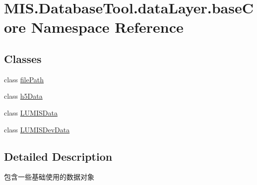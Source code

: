 \hypertarget{namespaceMIS_1_1DatabaseTool_1_1dataLayer_1_1baseCore}{}\section{M\+I\+S.\+Database\+Tool.\+data\+Layer.\+base\+Core Namespace Reference}
\label{namespaceMIS_1_1DatabaseTool_1_1dataLayer_1_1baseCore}
\subsection*{Classes}
\begin{DoxyCompactItemize}
\item 
class \hyperlink{classMIS_1_1DatabaseTool_1_1dataLayer_1_1baseCore_1_1filePath}{file\+Path}
\item 
class \hyperlink{classMIS_1_1DatabaseTool_1_1dataLayer_1_1baseCore_1_1h5Data}{h5\+Data}
\item 
class \hyperlink{classMIS_1_1DatabaseTool_1_1dataLayer_1_1baseCore_1_1LUMISData}{L\+U\+M\+I\+S\+Data}
\item 
class \hyperlink{classMIS_1_1DatabaseTool_1_1dataLayer_1_1baseCore_1_1LUMISDevData}{L\+U\+M\+I\+S\+Dev\+Data}
\end{DoxyCompactItemize}


\subsection{Detailed Description}
\begin{DoxyVerb}包含一些基础使用的数据对象
\end{DoxyVerb}
 